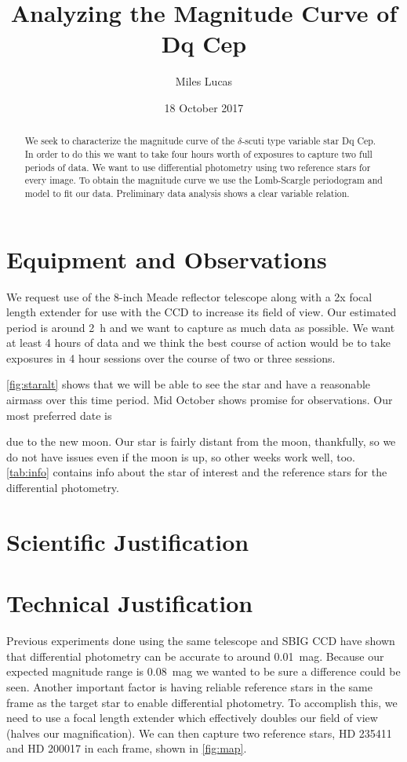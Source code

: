 \documentclass[]{article}
\title{Analyzing the Magnitude Curve of Dq Cep}
\author{Miles Lucas}
\begin{document}
\maketitle

\begin{abstract}
	We seek to characterize the magnitude curve of the $\delta$-scuti type variable star Dq Cep. In order to do this we want to take four hours worth of exposures to capture two full periods of data. We want to use differential photometry using two reference stars for every image. To obtain the magnitude curve we use the Lomb-Scargle periodogram and model to fit our data. Preliminary data analysis shows a clear variable relation.
\end{abstract}

\section{Equipment and Observations}
	We request use of the 8-inch Meade reflector telescope along with a 2x focal length extender for use with the CCD to increase its field of view. Our estimated period is around \SI{2}{\hour} and we want to capture as much data as possible. We want at least 4 hours of data and we think the best course of action would be to take exposures in 4 hour sessions over the course of two or three sessions. 
	
	\autoref{fig:staralt} shows that we will be able to see the star and have a reasonable airmass over this time period. Mid October shows promise for observations. Our most preferred date is \date{18 October 2017} due to the new moon. Our star is fairly distant from the moon, thankfully, so we do not have issues even if the moon is up, so other weeks work well, too. \autoref{tab:info} contains info about the star of interest and the reference stars for the differential photometry.
	

\section{Scientific Justification}


\section{Technical Justification}

	Previous experiments done using the same telescope and SBIG CCD have shown that differential photometry can be accurate to around \SI{0.01}{mag}. Because our expected magnitude range is \SI{0.08}{mag} we wanted to be sure a difference could be seen. Another important factor is having reliable reference stars in the same frame as the target star to enable differential photometry. To accomplish this, we need to use a focal length extender which effectively doubles our field of view (halves our magnification). We can then capture two reference stars, HD 235411 and HD 200017 in each frame, shown in \autoref{fig:map}.
	
\end{document}
